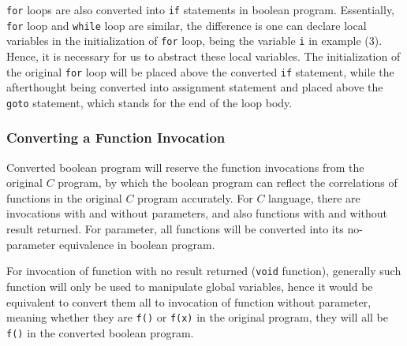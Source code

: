 \lstinline|for| loops are also converted into \lstinline|if| statements in boolean program.
Essentially, \lstinline|for| loop and \lstinline|while| loop are similar, the difference is one can declare local variables in the initialization of \lstinline|for| loop, being the variable \lstinline|i| in example (3). Hence, it is necessary for us to abstract these local variables.
The initialization of the original \lstinline|for| loop will be placed above the converted \lstinline|if| statement,
while the afterthought being converted into assignment statement and placed above the \lstinline|goto| statement, which stands for the end of the loop body.

\subsubsection{Converting a Function Invocation}
\label{section:ConvertingAFunctionInvocation}
Converted boolean program will reserve the function invocations from the original $C$ program, by which the boolean program can reflect the correlations of functions in the original $C$ program accurately.
For $C$ language, there are invocations with and without parameters, and also functions with and without result returned. For parameter, all functions will be converted into its no-parameter equivalence in boolean program.

For invocation of function with no result returned (\lstinline|void| function), generally such function will only be used to manipulate global variables, hence it would be equivalent to convert them all to invocation of function without parameter, meaning whether they are \lstinline|f()| or \lstinline|f(x)| in the original program, they will all be \lstinline|f()| in the converted boolean program.

